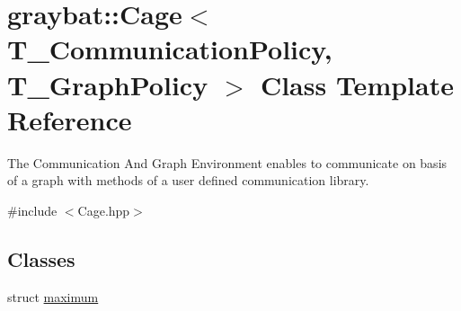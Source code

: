 \hypertarget{structgraybat_1_1Cage}{}\section{graybat\+:\+:Cage$<$ T\+\_\+\+Communication\+Policy, T\+\_\+\+Graph\+Policy $>$ Class Template Reference}
\label{structgraybat_1_1Cage}


The Communication And Graph Environment enables to communicate on basis of a graph with methods of a user defined communication library.  




{\ttfamily \#include $<$Cage.\+hpp$>$}

\subsection*{Classes}
\begin{DoxyCompactItemize}
\item 
struct \hyperlink{structgraybat_1_1Cage_1_1maximum}{maximum}
\end{DoxyCompactItemize}
